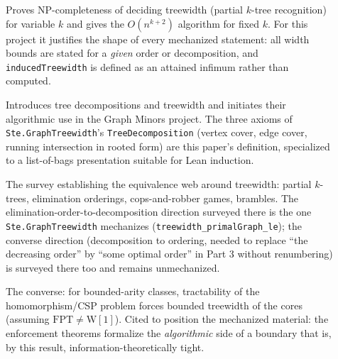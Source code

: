 \documentclass[11pt]{article}
\newcommand{\ste}[1]{\texttt{#1}}
\begin{document}
\begin{description}
\item[\citet{arnborg1987complexity}] Proves NP-completeness of
deciding treewidth (partial $k$-tree recognition) for variable $k$ and
gives the $O(n^{k+2})$ algorithm for fixed $k$. For this project it
justifies the shape of every mechanized statement: all width bounds
are stated for a \emph{given} order or decomposition, and
\ste{inducedTreewidth} is defined as an attained infimum rather than
computed.

\item[\citet{robertson1986graphminorsII}] Introduces tree
decompositions and treewidth and initiates their algorithmic use in
the Graph Minors project. The three axioms of
\ste{Ste.GraphTreewidth}'s \ste{TreeDecomposition} (vertex cover, edge
cover, running intersection in rooted form) are this paper's
definition, specialized to a list-of-bags presentation suitable for
Lean induction.

\item[\citet{bodlaender1998arboretum}] The survey establishing the
equivalence web around treewidth: partial $k$-trees, elimination
orderings, cops-and-robber games, brambles. The
elimination-order-to-decomposition direction surveyed there is the one
\ste{Ste.GraphTreewidth} mechanizes
(\ste{treewidth\_primalGraph\_le}); the converse direction
(decomposition to ordering, needed to replace ``the decreasing
order'' by ``some optimal order'' in Part 3 without renumbering) is
surveyed there too and remains unmechanized.

\item[\citet{grohe2007complexity}] The converse: for bounded-arity
classes, tractability of the homomorphism/CSP problem forces bounded
treewidth of the cores (assuming $\mathrm{FPT}\ne\mathrm{W[1]}$).
Cited to position the mechanized material: the enforcement theorems
formalize the \emph{algorithmic} side of a boundary that is, by this
result, information-theoretically tight.

\end{description}



\end{document}
